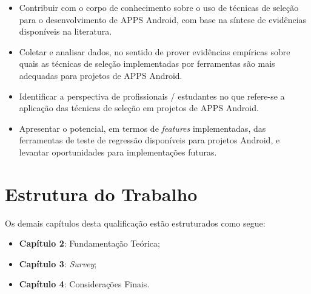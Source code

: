 \begin{itemize}

    \item Contribuir com o corpo de conhecimento sobre o uso de técnicas de seleção para o desenvolvimento de \ac{APPS} Android, com base na síntese de evidências disponíveis na literatura.
    
    \item Coletar e analisar dados, no sentido de prover evidências empíricas sobre quais as técnicas de seleção implementadas por ferramentas são mais adequadas para projetos de \ac{APPS} Android.
    
    \item Identificar a perspectiva de profissionais / estudantes no que refere-se a aplicação das técnicas de seleção em projetos de \ac{APPS} Android.
    
    \item Apresentar o potencial, em termos de \textit{features} implementadas, das ferramentas de teste de regressão disponíveis para projetos Android, e levantar oportunidades para implementações futuras.

\end{itemize}


\section{Estrutura do Trabalho}\label{sec:estruturadotrabalho}

Os demais capítulos desta qualificação estão estruturados como segue: 
\begin{itemize}
\item \textbf{Capítulo 2}: Fundamentação Teórica;
\item \textbf{Capítulo 3}: \textit{Survey};
\item \textbf{Capítulo 4}: Considerações Finais.
\end{itemize}
